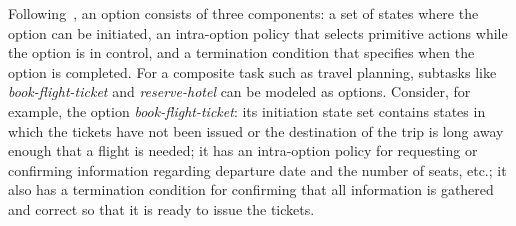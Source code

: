 \documentclass[11pt,letterpaper]{article}
\begin{document}
Following~, an option consists of three components: a set of states where the option can be initiated, an intra-option policy that selects primitive actions while the option is in control, and a termination condition that specifies when the option is completed.  For a composite task such as travel planning, subtasks like \textit{book-flight-ticket} and \textit{reserve-hotel} can be modeled as options. Consider, for example, the option \textit{book-flight-ticket}: its initiation state set contains states in which the tickets have not been issued or the destination of the trip is long away enough that a flight is needed; it has an intra-option policy for requesting or confirming information regarding departure date and the number of seats, etc.; it also has a termination condition for confirming that all information is gathered and correct so that it is ready to issue the tickets.


\end{document}
